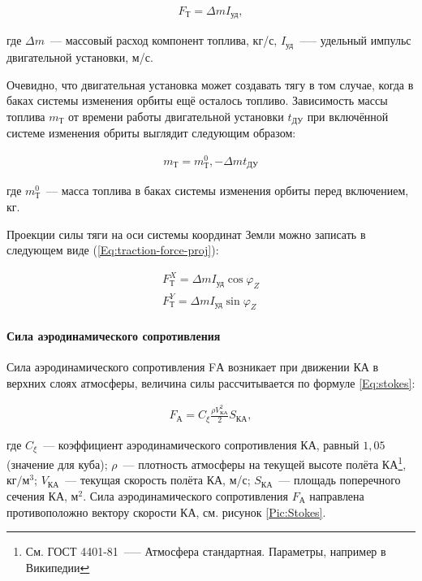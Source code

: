 \documentclass[12pt,a4paper]{article}
\begin{document}
\begin{eqnarray}
  F_{\text{Т}} = \Delta m I_{\text{уд}}, \label{Eq:traction-force}
\end{eqnarray}

где $\Delta m$~--– массовый расход компонент топлива, кг/с, $I_{\text{уд}}$~---– удельный
импульс двигательной установки, м/с.

Очевидно, что двигательная установка может создавать тягу в том случае, когда в баках
системы изменения орбиты ещё осталось топливо. Зависимость массы топлива $m_{\text{Т}}$ от времени
работы двигательной установки $t_{\text{ДУ}}$ при включённой системе изменения обриты выглядит
следующим образом:

\begin{eqnarray}
  m_{\text{Т}} = m_{\text{Т}}^0, - \Delta m t_{\text{ДУ}}
\end{eqnarray}

где $m_{\text{Т}}^0$~--– масса топлива в баках системы изменения орбиты перед включением,
кг.

Проекции силы тяги на оси системы координат Земли можно записать в следующем виде
(\ref{Eq:traction-force-proj}):

\begin{eqnarray}
  F_{\text{Т}}^X = \Delta m I_{\text{уд}} \cos{\varphi_Z} \nonumber \\
  F_{\text{Т}}^Y = \Delta m I_{\text{уд}} \sin{\varphi_Z} \label{Eq:traction-force-proj}
\end{eqnarray}

\paragraph{Сила аэродинамического сопротивления}

Сила аэродинамического сопротивления FА возникает при движении КА в верхних слоях
атмосферы, величина силы рассчитывается по формуле \ref{Eq:stokes}:

\begin{eqnarray}
  F_{\text{А}} = C_\xi \frac{\rho V_{\text{КА}}^2}{2} S_{\text{КА}}, \label{Eq:stokes}
\end{eqnarray}

где $C_\xi$~--– коэффициент аэродинамического сопротивления КА, равный $1,05$ (значение
для куба); $\rho$~--– плотность атмосферы на текущей высоте полёта КА\footnote{См. ГОСТ
  4401-81~--— Атмосфера стандартная. Параметры, например в Википедии},
$\text{кг}/\text{м}^3$; $V_{\text{КА}}$~--– текущая скорость полёта КА, м/с;
$S_{\text{КА}}$~--– площадь поперечного сечения КА, $\text{м}^2$. Сила аэродинамического
сопротивления $F_{\text{А}}$ направлена противоположно вектору скорости КА, см. рисунок
\ref{Pic:Stokes}.
\end{document}
